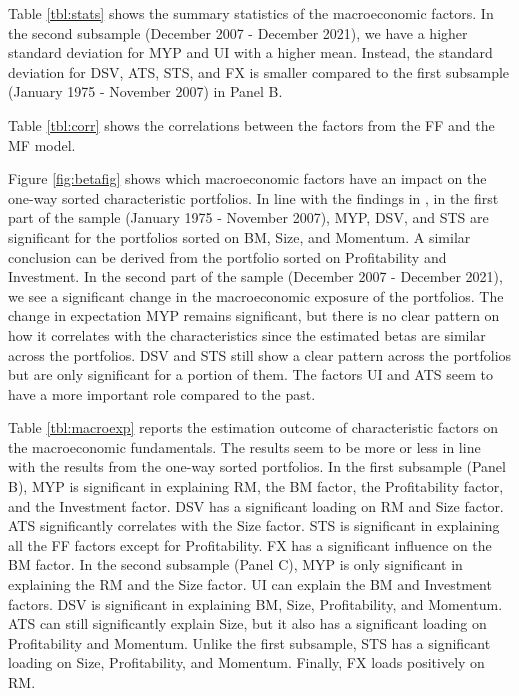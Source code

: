 \documentclass[11pt,halfline,a4paper]{ouparticle}
\begin{document}
Table \ref{tbl:stats} shows the summary statistics of the macroeconomic factors. In the second subsample (December 2007 - December 2021), we have a higher standard deviation for MYP and UI with a higher mean. Instead, the standard deviation for DSV, ATS, STS, and FX is smaller compared to the first subsample (January 1975 - November 2007) in Panel B.

Table \ref{tbl:corr} shows the correlations between the factors from the FF and the MF model.


Figure \ref{fig:betafig} shows which macroeconomic factors have an impact on the one-way sorted characteristic portfolios. In line with the findings in \cite{aretz2010macroeconomic}, in the first part of the sample (January 1975 - November 2007), MYP, DSV, and STS are significant for the portfolios sorted on BM, Size, and Momentum. A similar conclusion can be derived from the portfolio sorted on Profitability and Investment. In the second part of the sample (December 2007 - December 2021), we see a significant change in the macroeconomic exposure of the portfolios. The change in expectation MYP remains significant, but there is no clear pattern on how it correlates with the characteristics since the estimated betas are similar across the portfolios. DSV and STS still show a clear pattern across the portfolios but are only significant for a portion of them. The factors UI and ATS seem to have a more important role compared to the past.

Table \ref{tbl:macroexp} reports the estimation outcome of characteristic factors on the macroeconomic fundamentals. The results seem to be more or less in line with the results from the one-way sorted portfolios. In the first subsample (Panel B), MYP is significant in explaining RM, the BM factor, the Profitability factor, and the Investment factor. DSV has a significant loading on  RM and Size factor. ATS significantly correlates with the Size factor. STS is significant in explaining all the FF factors except for Profitability. FX has a significant influence on the BM factor. In the second subsample (Panel C), MYP is only significant in explaining the RM and the Size factor. UI can explain the BM and Investment factors. DSV is significant in explaining BM, Size, Profitability, and Momentum. ATS can still significantly explain Size, but it also has a significant loading on Profitability and Momentum. Unlike the first subsample, STS has a significant loading on Size, Profitability, and Momentum. Finally, FX loads positively on RM.
\end{document}

